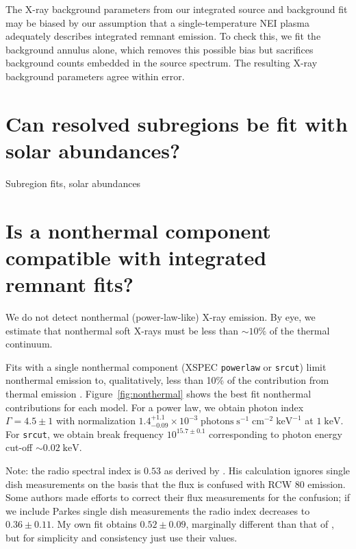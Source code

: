 \documentclass[twocolumn,tighten,trackchanges]{aastex61}
\newcommand*{\mt}{\mathrm}
\newcommand*{\unit}[1]{\;\mt{#1}}  %
\newcommand*{\abt}{\mathord{\sim}} %
\begin{document}
The X-ray background parameters from our integrated source and background fit
may be biased by our assumption that a single-temperature NEI plasma adequately
describes integrated remnant emission.
To check this, we fit the background annulus alone, which removes this possible
bias but sacrifices background counts embedded in the source spectrum.
The resulting X-ray background parameters agree within error.

\section{Can resolved subregions be fit with solar abundances?}

\begin{table*}[!ht]
    \centering
    \caption{Subregion fits, solar abundances}
    \footnotesize
    
\end{table*}

\clearpage
\section{Is a nonthermal component compatible with integrated remnant fits?}

We do not detect nonthermal (power-law-like) X-ray emission.
By eye, we estimate that nonthermal soft X-rays must be less than $\abt 10\%$
of the thermal continuum.

Fits with a single nonthermal component (XSPEC \texttt{powerlaw} or
\texttt{srcut}) limit nonthermal emission to, qualitatively, less than 10\% of
the contribution from thermal emission \citep[cf.][]{reynolds1999}.
Figure~\ref{fig:nonthermal} shows the best fit nonthermal contributions for
each model.
For a power law, we obtain photon index $\Gamma = 4.5 \pm 1$ with
normalization $1.4^{+1.1}_{-0.09} \times 10^{-3} \unit{photons\;s^{-1}\;cm^{-2}\;keV^{-1}}$
at $1 \unit{keV}$.
For \texttt{srcut}, we obtain break frequency $10^{15.7 \pm 0.1}$
corresponding to photon energy cut-off $\abt 0.02 \unit{keV}$.

Note: the radio spectral index is $0.53$ as derived by \citet{gaensler1998-g309}.
His calculation ignores single dish measurements on the basis that the flux
is confused with RCW 80 emission.  Some authors made efforts to correct their
flux measurements for the confusion; if we include Parkes single dish
measurements the radio index decreases to $0.36 \pm 0.11$.
My own fit obtains $0.52 \pm 0.09$, marginally different than that of
\citet{gaensler1998-g309}, but for simplicity and consistency just use their values.
\end{document}

